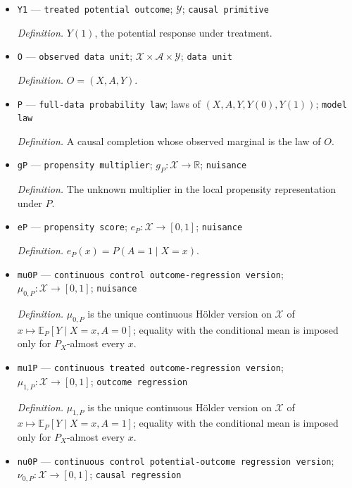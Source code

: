 \documentclass{article}
\begin{document}
\begin{itemize}
  \par\smallskip\noindent\emph{Definition.} \(Y(0)\), the potential response under control.
  \item \texttt{Y1} --- \texttt{treated potential outcome}; \(\mathcal Y\); \texttt{causal primitive}
  \par\smallskip\noindent\emph{Definition.} \(Y(1)\), the potential response under treatment.
  \item \texttt{O} --- \texttt{observed data unit}; \(\mathcal X\times\mathcal A\times\mathcal Y\); \texttt{data unit}
  \par\smallskip\noindent\emph{Definition.} \(O=(X,A,Y)\).
  \item \texttt{P} --- \texttt{full-\allowbreak{}data probability law}; laws of \((X,A,Y,Y(0),Y(1))\); \texttt{model law}
  \par\smallskip\noindent\emph{Definition.} A causal completion whose observed marginal is the law of \(O\).
  \item \texttt{gP} --- \texttt{propensity multiplier}; \(g_P:\mathcal X\to\mathbb R\); \texttt{nuisance}
  \par\smallskip\noindent\emph{Definition.} The unknown multiplier in the local propensity representation under \(P\).
  \item \texttt{eP} --- \texttt{propensity score}; \(e_P:\mathcal X\to[0,1]\); \texttt{nuisance}
  \par\smallskip\noindent\emph{Definition.} \(e_P(x)=P(A=1\mid X=x)\).
  \item \texttt{mu0P} --- \texttt{continuous control outcome-\allowbreak{}regression version}; \(\mu_{0,P}:\mathcal X\to[0,1]\); \texttt{nuisance}
  \par\smallskip\noindent\emph{Definition.} \(\mu_{0,P}\) is the unique continuous H\"older version on \(\mathcal X\) of \(x\mapsto\mathbb E_P[Y\mid X=x,A=0]\); equality with the conditional mean is imposed only for \(P_X\)-almost every \(x\).
  \item \texttt{mu1P} --- \texttt{continuous treated outcome-\allowbreak{}regression version}; \(\mu_{1,P}:\mathcal X\to[0,1]\); \texttt{outcome regression}
  \par\smallskip\noindent\emph{Definition.} \(\mu_{1,P}\) is the unique continuous H\"older version on \(\mathcal X\) of \(x\mapsto\mathbb E_P[Y\mid X=x,A=1]\); equality with the conditional mean is imposed only for \(P_X\)-almost every \(x\).
  \item \texttt{nu0P} --- \texttt{continuous control potential-\allowbreak{}outcome regression version}; \(\nu_{0,P}:\mathcal X\to[0,1]\); \texttt{causal regression}

\end{itemize}
\end{document}
